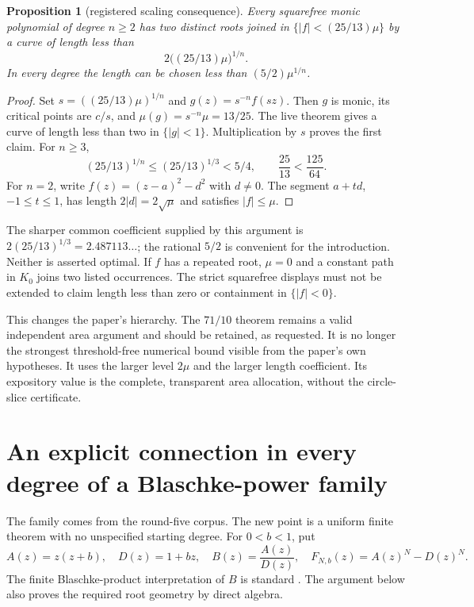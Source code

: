 \documentclass[11pt,a4paper]{article}
\newtheorem{proposition}[theorem]{Proposition}
\theoremstyle{remark}\newtheorem{remark}[theorem]{Remark}
\begin{document}
\begin{proposition}[registered scaling consequence]\label{thm:scale}
Every squarefree monic polynomial of degree $n\ge2$ has two distinct roots
joined in $\{|f|<(25/13)\mu\}$ by a curve of length less than
\[
 2\bigl((25/13)\mu\bigr)^{1/n}.
\]
In every degree the length can be chosen less than $(5/2)\mu^{1/n}$.
\end{proposition}
\begin{proof}
Set $s=((25/13)\mu)^{1/n}$ and $g(z)=s^{-n}f(sz)$. Then $g$ is monic,
its critical points are $c/s$, and $\mu(g)=s^{-n}\mu=13/25$.
The live theorem gives a curve of length less than two in $\{|g|<1\}$.
Multiplication by $s$ proves the first claim.
For $n\ge3$,
\[
 (25/13)^{1/n}\le(25/13)^{1/3}<5/4,
 \qquad \frac{25}{13}<\frac{125}{64}.
\]
For $n=2$, write $f(z)=(z-a)^2-d^2$ with $d\ne0$.
The segment $a+td$, $-1\le t\le1$, has length $2|d|=2\sqrt\mu$
and satisfies $|f|\le\mu$.
\end{proof}

The sharper common coefficient supplied by this argument is
$2(25/13)^{1/3}=2.487113\ldots$; the rational $5/2$ is convenient for the
introduction. Neither is asserted optimal. If $f$ has a repeated root,
$\mu=0$ and a constant path in $K_0$ joins two listed occurrences. The strict
squarefree displays must not be extended to claim length less than zero or
containment in $\{|f|<0\}$.

This changes the paper's hierarchy. The $71/10$ theorem remains a valid
independent area argument and should be retained, as requested. It is no
longer the strongest threshold-free numerical bound visible from the paper's
own hypotheses. It uses the larger level $2\mu$ and the larger length
coefficient. Its expository value is the complete, transparent area
allocation, without the circle-slice certificate.

\section{An explicit connection in every degree of a Blaschke-power family}

The family comes from the round-five corpus. The new point is a uniform
finite theorem with no unspecified starting degree.
For $0<b<1$, put
\[
 A(z)=z(z+b),\quad D(z)=1+bz,\quad
 B(z)=\frac{A(z)}{D(z)},\quad F_{N,b}(z)=A(z)^N-D(z)^N.
\]
The finite Blaschke-product interpretation of $B$ is standard
\cite{blaschke}. The argument below also proves the required root geometry
by direct algebra.
\end{document}
